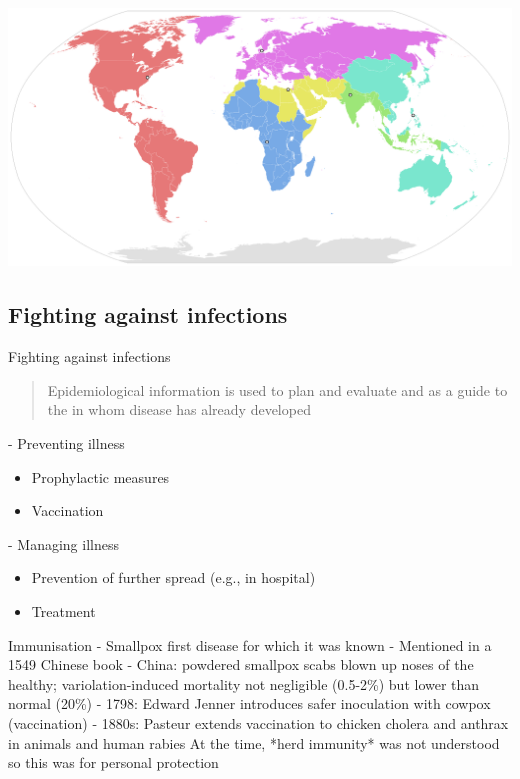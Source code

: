 \documentclass[aspectratio=169]{beamer}\usepackage[]{graphicx}\usepackage[]{xcolor}
\begin{document}
\begin{frame}
    \includegraphics[width=\textwidth]{FIGS/1280px-World_Health_Organisation_regional_offices.png}
\end{frame}



\subsection{Fighting against infections}

\begin{frame}{Fighting against infections}
\begin{quote}
    Epidemiological information is used to plan and evaluate  and as a guide to the  in whom disease has already developed  
\end{quote}
\vfill
- Preventing illness
\begin{itemize}
    \item Prophylactic measures
    \item Vaccination
\end{itemize}
\vfill
- Managing illness
\begin{itemize}
    \item Prevention of further spread (e.g., in hospital) 
    \item Treatment
\end{itemize}
\end{frame}


\begin{frame}{Immunisation}
- Smallpox first disease for which it was known 
\vfill
- Mentioned in a 1549 Chinese book
\vfill
- China: powdered smallpox scabs blown up noses of the healthy; variolation-induced mortality not negligible (0.5-2\%) but lower than normal (20\%)
\vfill
- 1798:  Edward Jenner introduces safer inoculation with cowpox (vaccination)
\vfill
- 1880s: Pasteur extends vaccination to chicken cholera and anthrax in animals and human rabies
\vfill
At the time, *herd immunity* was not understood so this was for personal protection
\end{frame}
\end{document}
